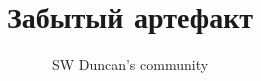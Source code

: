 \documentclass[11pt]{article} %
\title{Забытый артефакт}
\author{SW Duncan's community}
\begin{document}
\maketitle

\begin{myquote}

\end{myquote}

\begin{myquote}

\end{myquote}

\begin{myquote}

\end{myquote}


\begin{myquote}

\end{myquote}

\begin{myquote}

\end{myquote}
\end{document}
